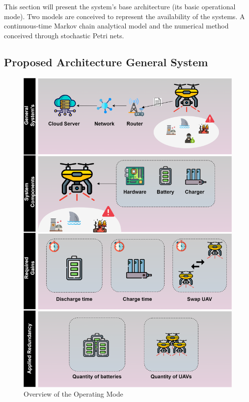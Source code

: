 \documentclass[conference]{IEEEtran}
\begin{document}
This section will present the system's base architecture (its basic operational mode). Two models are conceived to represent the availability of the systems. A continuous-time Markov chain analytical model and the numerical method conceived through stochastic Petri nets.

\subsection{Proposed Architecture General System}

\begin{figure}[htbp]
\centerline{\includegraphics[scale=0.45]{img/operating_model.png}}
\caption{Overview of the Operating Mode}
\label{fig:operating_mode_overview}
\end{figure}
\end{document}
